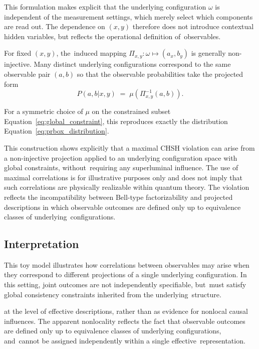 \documentclass[quantumrep,article,accept,pdftex,oneauthor]{Definitions/mdpi}
\theoremstyle{remark}
\begin{document}
    This formulation makes explicit that the underlying configuration $\omega$ is
    independent of the measurement settings, which merely select which components are
    read out.
    The dependence on $(x,y)$ therefore does not introduce contextual hidden variables,
    but reflects the operational definition of~observables.

    For fixed $(x,y)$, the~induced mapping
    $\Pi_{x,y}:\omega \mapsto (a_x,b_y)$ is generally non-injective.
    Many distinct underlying configurations correspond to the same observable pair
    $(a,b)$ so that the observable probabilities take the projected form
\begin{equation}
      P(a,b|x,y) \;=\; \mu\!\left(\Pi_{x,y}^{-1}(a,b)\right).
      \label{eq:projected_probabilities_chsh}
    \end{equation}

    For a symmetric choice of $\mu$ on the constrained subset
    Equation~\eqref{eq:global_constraint}, this reproduces exactly the distribution
    Equation~\eqref{eq:prbox_distribution}.

    This construction shows explicitly that a maximal CHSH violation can arise from a
    non-injective projection applied to an underlying configuration space with global
    constraints, without~requiring any superluminal influence.
    The use of maximal correlations is for illustrative purposes only and does not
    imply that such correlations are physically realizable within quantum theory.
    The violation reflects the incompatibility between Bell-type factorizability and
    projected descriptions in which observable outcomes are defined only up to
    equivalence classes of underlying~configurations.

  \subsection{Interpretation}
    \label{subsec:interpretation}

    This toy model illustrates how correlations between observables may arise when they
    correspond to different projections of a single underlying configuration.
    In this setting, joint outcomes are not independently specifiable, but~must satisfy
    global consistency constraints inherited from the underlying~structure.

     at the level of effective descriptions, rather than as evidence
    for nonlocal causal influences.
    The apparent nonlocality reflects the fact that observable outcomes are defined only
    up to equivalence classes of underlying configurations, and~cannot be assigned
    independently within a single effective~representation.
\end{document}
